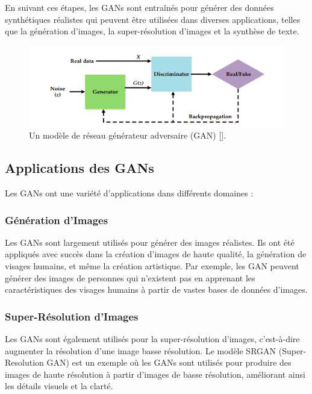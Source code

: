En suivant ces étapes, les GANs sont entraînés pour générer des données
synthétiques réalistes qui peuvent être utilisées dans diverses applications,
telles que la génération d'images, la super-résolution d'images et la synthèse
de texte.

\begin{figure}[hbt!]
	\centering
	\includegraphics[width=12cm]{images_pfe/gan_1.png}
	\caption{Un modèle de réseau générateur adversaire (GAN) [\cite{feng_feng_chen_cao_zhang_jiao_yu_2020}].}
	\label{fig:gan}
\end{figure}
\FloatBarrier

\subsection{Applications des GANs}

Les GANs ont une variété d'applications dans différents domaines :

\subsubsection{Génération d'Images}

Les GANs sont largement utilisés pour générer des images réalistes. Ils ont été
appliqués avec succès dans la création d'images de haute qualité, la génération
de visages humains, et même la création artistique. Par exemple, les GAN
peuvent générer des images de personnes qui n'existent pas en apprenant les
caractéristiques des visages humains à partir de vastes bases de données
d'images.

\subsubsection{Super-Résolution d'Images}

Les GANs sont également utilisés pour la super-résolution d'images,
c'est-à-dire augmenter la résolution d'une image basse résolution. Le modèle
SRGAN (Super-Resolution GAN) est un exemple où les GANs sont utilisés pour
produire des images de haute résolution à partir d'images de basse résolution,
améliorant ainsi les détails visuels et la clarté.

